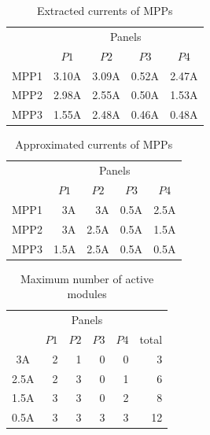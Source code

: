 \documentclass[conference]{pvsctran}
\begin{document}
\begin{table}[t]
\caption{Extracted currents of MPPs}
\label{tab:monitored}
\centering
\begin{tabular}{c|rrrr}
\hline\hline
       &    	\multicolumn{4}{c}{Panels}								\\
	&	\multicolumn{1}{c}{$P1$}	&	\multicolumn{1}{c}{$P2$}	&	\multicolumn{1}{c}{$P3$}	&	\multicolumn{1}{c}{$P4$}	\\ \hline
MPP1	&	3.10A	&	3.09A	&	0.52A	&	2.47A	\\ \hline
MPP2	&	2.98A	&	2.55A	&	0.50A	&	1.53A	\\ \hline
MPP3	&	1.55A	&	2.48A	&	0.46A	&	0.48A	\\ \hline
\end{tabular}
\end{table}

\begin{table}[t]
\caption{Approximated currents of MPPs}
\label{tab:approximated}
\centering
\begin{tabular}{c|rrrr}	
\hline\hline
       &    	\multicolumn{4}{c}{Panels}	\\
	&	\multicolumn{1}{c}{$P1$}	&	\multicolumn{1}{c}{$P2$}	&	\multicolumn{1}{c}{$P3$}	&	\multicolumn{1}{c}{$P4$}	\\ \hline
MPP1	&	3A	&	3A	&	0.5A	&	2.5A	\\ \hline
MPP2	&	3A	&	2.5A	&	0.5A	&	1.5A	\\ \hline
MPP3	&	1.5A	&	2.5A	&	0.5A	&	0.5A	\\ \hline
\end{tabular}
\end{table}

\begin{table}[t]
\caption{Maximum number of active modules}
\label{tab:modules}
\centering
\begin{tabular}{c|rrrr|r}	
\hline\hline
       &    	\multicolumn{4}{c|}{Panels}	& \\									
	&	\multicolumn{1}{c}{$P1$}	&	\multicolumn{1}{c}{$P2$}	&	\multicolumn{1}{c}{$P3$}	&	\multicolumn{1}{c}{$P4$} &	\multicolumn{1}{|c}{total}	\\ \hline
3A	&	2	&	1	&	0	&	0 & 3	\\ \hline
2.5A	&	2	&	3	&	0	&	1 & 6	\\ \hline
1.5A	&	3	&	3	&	0	&	2 & 8	\\ \hline
0.5A	&	3	&	3	&	3	&	3 & 12	\\ \hline
\end{tabular}
\end{table}
\end{document}
